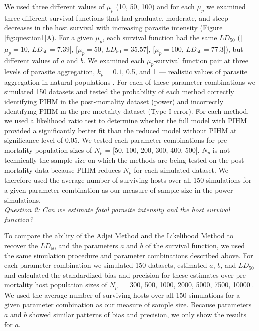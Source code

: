 \documentclass[12pt, a4paper]{article}
\begin{document}
We used three different values of $\mu_p$ (10, 50, 100) and for each $\mu_p$ we examined three different survival functions that had graduate, moderate, and steep decreases in the host survival with increasing parasite intensity (Figure \ref{fig:question1}A).  For a given $\mu_p$, each survival function had the same $LD_{50}$ ([$\mu_p = 10$, $LD_{50} = 7.39$], [$\mu_p = 50$, $LD_{50} = 35.57$], [$\mu_p = 100$, $LD_{50}= 77.3$]),  but different values of $a$ and $b$.  We examined each $\mu_p$-survival function pair at  three levels of parasite
aggregation, $k_p = 0.1$, 0.5, and 1 --- realistic values of parasite aggregation in natural populations \citep{Shaw1998}.  For each of these parameter
combinations we simulated 150 datasets and tested the probability of each method correctly identifying PIHM in the post-mortality dataset (power) and incorrectly identifying PIHM in the pre-mortality dataset (Type I error).  For each method, we used a likelihood ratio test to determine whether the full model with PIHM provided a significantly better fit than the reduced model without PIHM at significance level of 0.05.  We tested each parameter combinations for pre-mortality population sizes of $N_p$ = [50, 100, 200, 300, 400, 500]. $N_p$ is not technically the sample size on which the methods are being
tested on the post-mortality data because PIHM reduces $N_p$ for each simulated
dataset.  We therefore used the average number of surviving hosts over all 150 simulations for a given parameter combination as our measure of sample size in the power simulations.\\

\noindent
\emph{Question 2: Can we estimate fatal parasite intensity and the host survival function?}

To compare the ability of the Adjei Method and the Likelihood Method to recover the $LD_{50}$ and the parameters $a$ and $b$ of the survival function, we used the same simulation procedure and parameter combinations described above. For each parameter
combination we simulated 150 datasets, estimated $a$, $b$, and $LD_{50}$ and calculated the standardized bias and
precision \citep{Walther2005} for these estimates over pre-mortality host population sizes of $N_p$ = [300, 500, 1000, 2000, 5000, 7500,
10000]. We used the average number of surviving hosts over all 150 simulations for a given parameter combination as our measure of sample size.  Because parameters $a$ and $b$ showed similar patterns of bias and precision, we only show the results for $a$.
\end{document}
